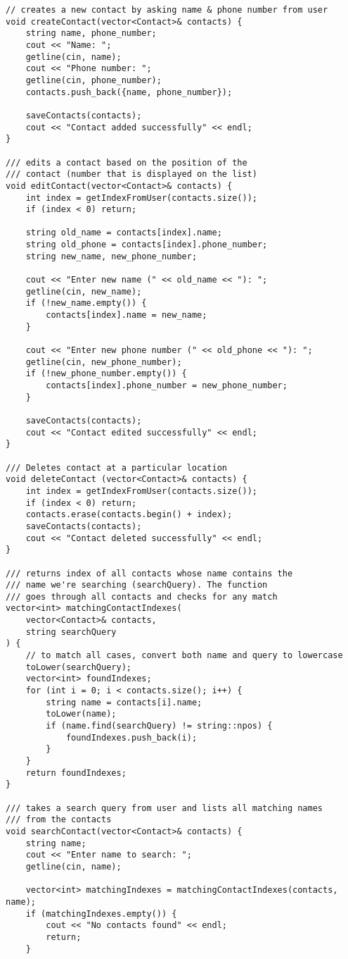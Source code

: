 \documentclass[12pt, a4paper]{article}
\begin{document}
\begin{verbatim}
// creates a new contact by asking name & phone number from user
void createContact(vector<Contact>& contacts) {
	string name, phone_number;
	cout << "Name: ";
	getline(cin, name);
	cout << "Phone number: ";
	getline(cin, phone_number);
	contacts.push_back({name, phone_number});

	saveContacts(contacts);
	cout << "Contact added successfully" << endl;
}

/// edits a contact based on the position of the
/// contact (number that is displayed on the list)
void editContact(vector<Contact>& contacts) {
	int index = getIndexFromUser(contacts.size());
	if (index < 0) return;

	string old_name = contacts[index].name;
	string old_phone = contacts[index].phone_number;
	string new_name, new_phone_number;

	cout << "Enter new name (" << old_name << "): ";
	getline(cin, new_name);
	if (!new_name.empty()) {
		contacts[index].name = new_name;
	}

	cout << "Enter new phone number (" << old_phone << "): ";
	getline(cin, new_phone_number);
	if (!new_phone_number.empty()) {
		contacts[index].phone_number = new_phone_number;
	}

	saveContacts(contacts);
	cout << "Contact edited successfully" << endl;
}

/// Deletes contact at a particular location
void deleteContact (vector<Contact>& contacts) {
	int index = getIndexFromUser(contacts.size());
	if (index < 0) return;
	contacts.erase(contacts.begin() + index);
	saveContacts(contacts);
	cout << "Contact deleted successfully" << endl;
}

/// returns index of all contacts whose name contains the
/// name we're searching (searchQuery). The function
/// goes through all contacts and checks for any match
vector<int> matchingContactIndexes(
	vector<Contact>& contacts,
	string searchQuery
) {
	// to match all cases, convert both name and query to lowercase
	toLower(searchQuery);
	vector<int> foundIndexes;
	for (int i = 0; i < contacts.size(); i++) {
		string name = contacts[i].name;
		toLower(name);
		if (name.find(searchQuery) != string::npos) {
			foundIndexes.push_back(i);
		}
	}
	return foundIndexes;
}

/// takes a search query from user and lists all matching names
/// from the contacts
void searchContact(vector<Contact>& contacts) {
	string name;
	cout << "Enter name to search: ";
	getline(cin, name);

	vector<int> matchingIndexes = matchingContactIndexes(contacts, name);
	if (matchingIndexes.empty()) {
		cout << "No contacts found" << endl;
		return;
	}


\end{verbatim}
\end{document}
